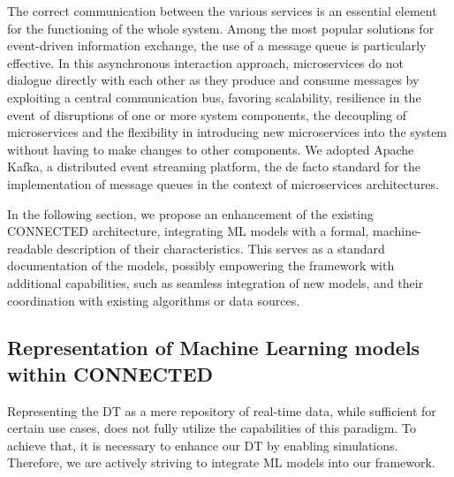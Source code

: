 The correct communication between the various services is an essential element for the functioning of the whole system. Among the most popular solutions for event-driven information exchange, the use of a message queue is particularly effective. In this asynchronous interaction approach, microservices do not dialogue directly with each other as they produce and consume messages by exploiting a central communication bus, favoring scalability, resilience in the event of disruptions of one or more system components, the decoupling of microservices and the flexibility in introducing new microservices into the system without having to make changes to other components. We adopted Apache Kafka, a distributed event streaming platform, the de facto standard for the implementation of message queues in the context of microservices architectures.

In the following section, we propose an enhancement of the existing CONNECTED architecture, integrating ML models with a formal, machine-readable description of their characteristics. This serves as a standard documentation of the models, possibly empowering the framework with additional capabilities, such as seamless integration of new models, and their coordination with existing algorithms or data sources.

\subsection{Representation of Machine Learning models within CONNECTED}\label{sec:paper4_representation}

Representing the DT as a mere repository of real-time data, while sufficient for certain use cases, does not fully utilize the capabilities of this paradigm. To achieve that, it is necessary to enhance our DT by enabling simulations. Therefore, we are actively striving to integrate ML models into our framework.

